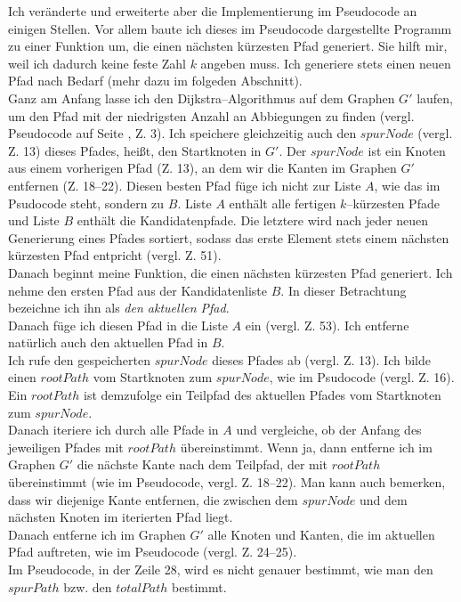 \documentclass[a4paper,10pt,ngerman]{scrartcl}
\begin{document}
Ich veränderte und erweiterte aber die Implementierung im Pseudocode an einigen Stellen.
Vor allem baute ich dieses im Pseudocode dargestellte Programm zu einer Funktion um, die einen nächsten kürzesten Pfad generiert.
Sie hilft mir, weil ich dadurch keine feste Zahl $k$ angeben muss.
Ich generiere stets einen neuen Pfad nach Bedarf (mehr dazu im folgeden Abschnitt).\\
Ganz am Anfang lasse ich den Dijkstra--Algorithmus auf dem Graphen $G'$ laufen, um den Pfad mit der niedrigsten Anzahl an
Abbiegungen zu finden (vergl. Pseudocode auf Seite \pageref{wikipedia.pseudo}, Z. 3).
Ich speichere gleichzeitig auch den $spurNode$ (vergl. Z. 13) dieses Pfades, heißt, den Startknoten in $G'$.
Der $spurNode$ ist ein Knoten aus einem vorherigen Pfad (Z. 13), an dem wir die Kanten im Graphen $G'$ entfernen (Z. 18--22).
Diesen besten Pfad füge ich nicht zur Liste $A$, wie das im Psudocode steht, sondern zu $B$.
Liste $A$ enthält alle fertigen $k$--kürzesten Pfade und Liste $B$ enthält die Kandidatenpfade.
Die letztere wird nach jeder neuen Generierung eines Pfades sortiert, sodass das erste Element stets
einem nächsten kürzesten Pfad entpricht (vergl. Z. 51).\\
Danach beginnt meine Funktion, die einen nächsten kürzesten Pfad generiert. 
Ich nehme den ersten Pfad aus der Kandidatenliste $B$. In dieser Betrachtung bezeichne ich ihn als \textit{den aktuellen Pfad}.\\
Danach füge ich diesen Pfad in die Liste $A$ ein (vergl. Z. 53). Ich entferne natürlich auch den aktuellen Pfad in $B$.\\
Ich rufe den gespeicherten $spurNode$ dieses Pfades ab (vergl. Z. 13).
Ich bilde einen $rootPath$ vom Startknoten zum $spurNode$, wie im Psudocode (vergl. Z. 16).
Ein $rootPath$ ist demzufolge ein Teilpfad des aktuellen Pfades vom Startknoten zum $spurNode$.\\
Danach iteriere ich durch alle Pfade in $A$ und vergleiche, ob der Anfang des jeweiligen Pfades mit $rootPath$ übereinstimmt.
Wenn ja, dann entferne ich im Graphen $G'$ die nächste Kante nach dem Teilpfad, der mit $rootPath$ übereinstimmt
(wie im Pseudocode, vergl. Z. 18--22). Man kann auch bemerken, dass wir diejenige Kante entfernen,
die zwischen dem $spurNode$ und dem nächsten Knoten im iterierten Pfad liegt.\\
Danach entferne ich im Graphen $G'$ alle Knoten und Kanten, die im aktuellen Pfad auftreten,
wie im Pseudocode (vergl. Z. 24--25).\\
Im Pseudocode, in der Zeile 28, wird es nicht genauer bestimmt, wie man den $spurPath$ bzw. den $totalPath$ bestimmt.
\end{document}
